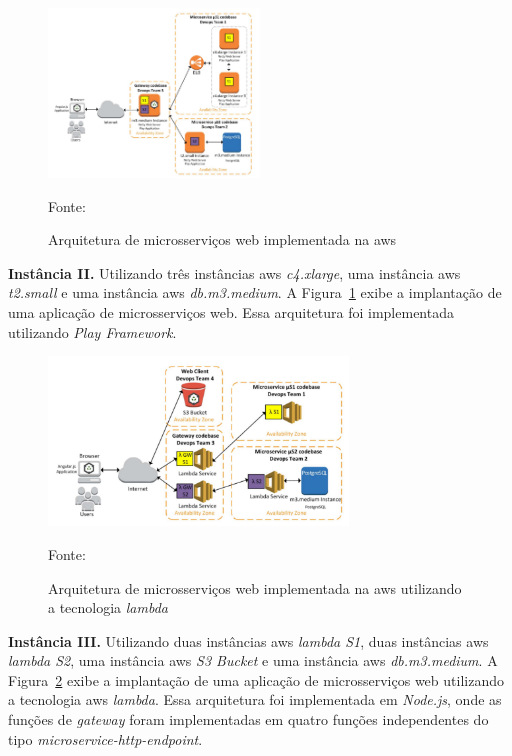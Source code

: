 \begin{figure}[htb!]
\caption{Arquitetura de microsserviços web implementada na \ac{aws}}
\label{fig:aws_microsservicos}
\includegraphics[height=4.5cm]{img/cap2/aws_microsservicos.png}
\centering

Fonte:~\cite{7515686}
\end{figure}

\textbf{Instância II.} Utilizando três instâncias \ac{aws} \textit{c4.xlarge}, uma instância \ac{aws} \textit{t2.small} e uma instância \ac{aws} \textit{db.m3.medium}.
%
A Figura~\ref{fig:aws_microsservicos} exibe a implantação de uma aplicação de microsserviços web. Essa arquitetura foi implementada utilizando \textit{Play Framework}.



\begin{figure}[htb!]
\caption{Arquitetura de microsserviços web implementada na \ac{aws} utilizando a tecnologia \textit{lambda}}
\label{fig:aws_lambda}
\includegraphics[height=4.5cm]{img/cap2/aws_lambda.png}
\centering

Fonte:~\cite{7515686}
\end{figure}

\textbf{Instância III.} Utilizando duas instâncias \ac{aws} \textit{lambda S1}, duas instâncias \ac{aws} \textit{lambda S2}, uma instância \ac{aws} \textit{S3 Bucket} e uma instância \ac{aws} \textit{db.m3.medium}.
%
A Figura~\ref{fig:aws_lambda} exibe a implantação de uma aplicação de microsserviços web utilizando a tecnologia \ac{aws} \textit{lambda}. Essa arquitetura foi implementada em \textit{Node.js}, onde as funções de \textit{gateway} foram implementadas em quatro funções independentes do tipo \textit{microservice-http-endpoint}.




